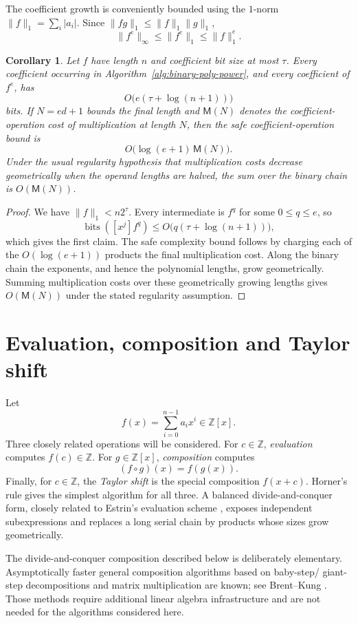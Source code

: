 \documentclass[11pt]{book}
\newtheorem{corollary}[theorem]{Corollary}
\theoremstyle{definition}
\newcommand{\ZZ}{\mathbb Z}
\newcommand{\bits}{\operatorname{bits}}
\begin{document}
The coefficient growth is conveniently bounded using the $1$-norm
$\|f\|_1=\sum_i|a_i|$.  Since $\|fg\|_1\le\|f\|_1\|g\|_1$,
\[
 \|f^e\|_\infty\le\|f^e\|_1\le\|f\|_1^e.
\]

\begin{corollary}\label{cor:binary-poly-power-growth}
Let $f$ have length $n$ and coefficient bit size at most $\tau$.  Every
coefficient occurring in Algorithm~\ref{alg:binary-poly-power}, and every
coefficient of $f^e$, has
\[
 O\bigl(e(\tau+\log(n+1))\bigr)
\]
bits.  If $N=ed+1$ bounds the final length and $\mathsf M(N)$ denotes the
coefficient-operation cost of multiplication at length $N$, then the safe
coefficient-operation bound is
\[
 O\bigl(\log(e+1)\,\mathsf M(N)\bigr).
\]
Under the usual regularity hypothesis that multiplication costs decrease
geometrically when the operand lengths are halved, the sum over the binary
chain is $O(\mathsf M(N))$.
\end{corollary}

\begin{proof}
We have $\|f\|_1<n2^\tau$.  Every intermediate is $f^q$ for some
$0\le q\le e$, so
\[
 \bits([x^j]f^q)
 \le O\bigl(q(\tau+\log(n+1))\bigr),
\]
which gives the first claim.  The safe complexity bound follows by charging
each of the $O(\log(e+1))$ products the final multiplication cost.  Along the
binary chain the exponents, and hence the polynomial lengths, grow
geometrically.  Summing multiplication costs over these geometrically growing
lengths gives $O(\mathsf M(N))$ under the stated regularity assumption.
\end{proof}

\section{Evaluation, composition and Taylor shift}

Let
\[
 f(x)=\sum_{i=0}^{n-1}a_ix^i\in\ZZ[x].
\]
Three closely related operations will be considered.  For $c\in\ZZ$,
\emph{evaluation} computes $f(c)\in\ZZ$.  For $g\in\ZZ[x]$,
\emph{composition} computes
\[
 (f\circ g)(x)=f(g(x)).
\]
Finally, for $c\in\ZZ$, the \emph{Taylor shift} is the special composition
$f(x+c)$.  Horner's rule gives the simplest algorithm for all three.  A
balanced divide-and-conquer form, closely related to Estrin's evaluation
scheme \cite{Estrin1960}, exposes independent subexpressions and replaces a
long serial chain by products whose sizes grow geometrically.

The divide-and-conquer composition described below is deliberately elementary.
Asymptotically faster general composition algorithms based on baby-step/
giant-step decompositions and matrix multiplication are known; see
Brent--Kung \cite{BrentKung1978}.  Those methods require additional linear
algebra infrastructure and are not needed for the algorithms considered here.
\end{document}

